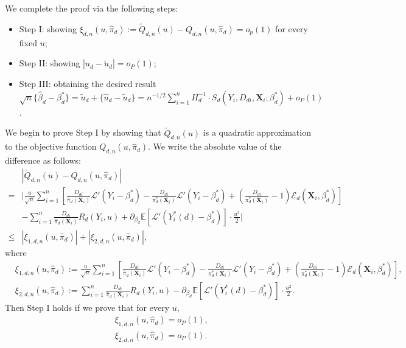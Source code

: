 \documentclass[11pt]{article}
\numberwithin{equation}{section}
\begin{document}
We complete the proof via the following steps:
\begin{itemize}
	\item Step I: showing $\xi_{d,n}(u,\widehat{\pi}_d):=\widetilde{Q}_{d,n}(u)-Q_{d,n}(u,\widehat{\pi}_d)=o_p(1)$ for every fixed $u$;
	\item Step II: showing $|\widehat{u}_{d}-\widetilde{u}_{d}|=o_P(1)$;
	\item Step III: obtaining the desired result $\sqrt{n}\{\widehat{\beta}_d-\beta_d^*\}=\widetilde{u}_{d}+\{\widehat{u}_{d}-\widetilde{u}_{d}\}=n^{-1/2}\sum_{i=1}^nH_d^{-1}\cdot S_d(Y_i,D_{di},\boldsymbol{X}_{i};\beta_d^*)+o_P(1)$.
\end{itemize}
We begin to prove Step I by showing that $\widetilde{Q}_{d,n}(u)$ is a quadratic approximation to the objective function $Q_{d,n}(u,\widehat{\pi}_d)$. We write the absolute value of the difference as follows:
\begin{align*}
	&\left|\widetilde{Q}_{d,n}(u)-Q_{d,n}(u,\widehat{\pi}_d)\right|\\
	=&\bigg|\frac{u}{\sqrt{n}}\sum_{i=1}^n\left[\frac{D_{di}}{\widehat{\pi}_d(\boldsymbol{X}_{i})}\mathcal{L}'(Y_i-\beta_d^*)-\frac{D_{di}}{{\pi}^*_d(\boldsymbol{X}_{i})}\mathcal{L}'(Y_i-\beta_d^*)+\left(\frac{D_{di}}{\pi_d^*(\boldsymbol{X}_{i})}-1\right)\mathcal{E}_{d}(\boldsymbol{X}_{i},\beta_d^*) \right]\\
	&-\sum_{i=1}^n\frac{D_{di}}{\widehat{\pi}_d(\boldsymbol{X}_{i})}R_d(Y_i,u)+\partial_{\beta_d}\mathbb{E}[\mathcal{L}'(Y^*_i(d)-\beta_d^*)]\cdot \frac{u^2}{2}\bigg|\\
	\leq &\left|\xi_{1,d,n}(u,\widehat{\pi}_d)\right|+\left|\xi_{2,d,n}(u,\widehat{\pi}_d)\right|,
\end{align*}
where
\begin{align*}
	&	\xi_{1,d,n}(u,\widehat{\pi}_d):=\frac{u}{\sqrt{n}}\sum_{i=1}^n\left[\frac{D_{di}}{\widehat{\pi}_d(\boldsymbol{X}_{i})}\mathcal{L}'(Y_i-\beta_d^*)-\frac{D_{di}}{{\pi}^*_d(\boldsymbol{X}_{i})}\mathcal{L}'(Y_i-\beta_d^*)+\left(\frac{D_{di}}{\pi_d^*(\boldsymbol{X}_{i})}-1\right)\mathcal{E}_{d}(\boldsymbol{X}_{i},\beta_d^*)\right],\\
	&\xi_{2,d,n}(u,\widehat{\pi}_d):=	\sum_{i=1}^n\frac{D_{di}}{\widehat{\pi}_d(\boldsymbol{X}_{i})}R_d(Y_i,u)-\partial_{\beta_d}\mathbb{E}[\mathcal{L}'(Y^*_i(d)-\beta_d^*)]\cdot \frac{u^2}{2}.
\end{align*}
Then Step I holds if we prove that for every $u$,
\begin{align}
	&\xi_{1,d,n}(u,\widehat{\pi}_d)=o_P(1),\label{eq:xi_1} \\
	&\xi_{2,d,n}(u,\widehat{\pi}_d)=o_P(1).\label{eq:xi_2}
\end{align}
\end{document}
